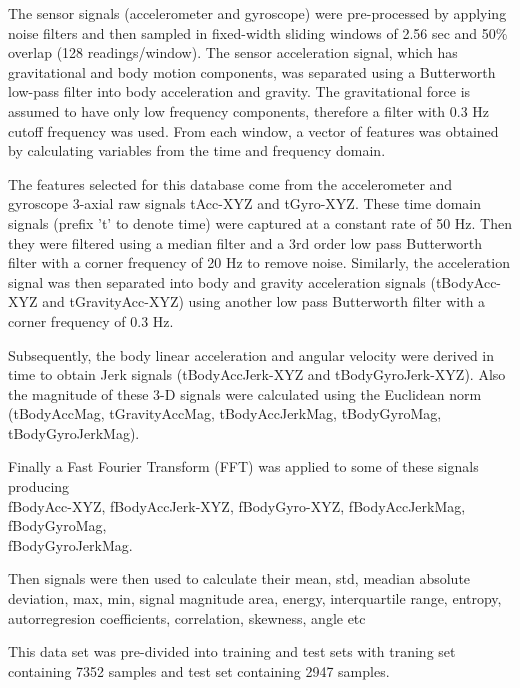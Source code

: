 \documentclass[12pt]{article}
\begin{document}
The sensor signals (accelerometer and gyroscope) were pre-processed by applying noise filters and then sampled in fixed-width sliding windows of 2.56 sec and 50$\%$ overlap (128 readings/window). The sensor acceleration signal, which has gravitational and body motion components, was separated using a Butterworth low-pass filter into body acceleration and gravity. The gravitational force is assumed to have only low frequency components, therefore a filter with 0.3 Hz cutoff frequency was used. From each window, a vector of features was obtained by calculating variables from the time and frequency domain.

The features selected for this database come from the accelerometer and gyroscope 3-axial raw signals tAcc-XYZ and tGyro-XYZ. These time domain signals (prefix 't' to denote time) were captured at a constant rate of 50 Hz. Then they were filtered using a median filter and a 3rd order low pass Butterworth filter with a corner frequency of 20 Hz to remove noise. Similarly, the acceleration signal was then separated into body and gravity acceleration signals (tBodyAcc-XYZ and tGravityAcc-XYZ) using another low pass Butterworth filter with a corner frequency of 0.3 Hz. 

Subsequently, the body linear acceleration and angular velocity were derived in time to obtain Jerk signals (tBodyAccJerk-XYZ and tBodyGyroJerk-XYZ). Also the magnitude of these 3-D signals were calculated using the Euclidean norm (tBodyAccMag, tGravityAccMag, tBodyAccJerkMag, tBodyGyroMag, tBodyGyroJerkMag). 

Finally a Fast Fourier Transform (FFT) was applied to some of these signals producing \\fBodyAcc-XYZ, fBodyAccJerk-XYZ, fBodyGyro-XYZ, fBodyAccJerkMag, fBodyGyroMag,\\ fBodyGyroJerkMag.

Then signals were then used to calculate their mean, std, meadian absolute deviation, max, min, signal magnitude area, energy, interquartile range, entropy, autorregresion coefficients, correlation, skewness, angle etc

This data set was pre-divided into training and test sets with traning set containing 7352 samples and test set containing 2947 samples.
\newpage
\end{document}
